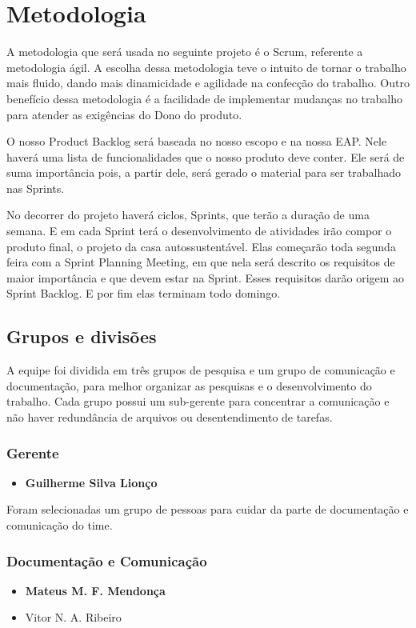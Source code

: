 \chapter[Metodologia]{Metodologia}

	A metodologia que será usada no seguinte projeto é o Scrum, referente a metodologia ágil. A escolha dessa metodologia teve o intuito de tornar o trabalho mais fluido, dando mais dinamicidade e agilidade na confecção do trabalho. Outro benefício dessa metodologia é a facilidade de implementar mudanças no trabalho para atender as exigências do Dono do produto.
	
	O nosso Product Backlog será baseada no nosso escopo e na nossa EAP. Nele haverá uma lista de funcionalidades que o nosso produto deve conter. Ele será de suma importância pois, a partir dele, será gerado o material para ser trabalhado nas Sprints.
	
	No decorrer do projeto haverá ciclos, Sprints, que terão a duração de uma semana. E em cada Sprint terá o desenvolvimento de atividades irão compor o produto final, o projeto da casa autossustentável. Elas começarão toda segunda feira com a Sprint Planning Meeting, em que nela será descrito os requisitos de maior importância e que devem estar na Sprint. Esses requisitos darão origem ao Sprint Backlog. E por fim elas terminam todo domingo. 
	
\section{Grupos e divisões}

	A equipe foi dividida em três grupos de pesquisa e um grupo de comunicação e documentação, para melhor organizar as pesquisas e o desenvolvimento do trabalho. Cada grupo possui um sub-gerente para concentrar a comunicação e não haver redundância de arquivos ou desentendimento de tarefas. 

\subsection{Gerente}
\begin{itemize}
\item \textbf{Guilherme Silva Lionço}
\end{itemize}

Foram selecionadas um grupo de pessoas para cuidar da parte de documentação e comunicação do time.
\subsection{Documentação e Comunicação}
\begin{itemize}
\item \textbf{Mateus M. F. Mendonça}
\item Vitor N. A. Ribeiro
\end{itemize}

